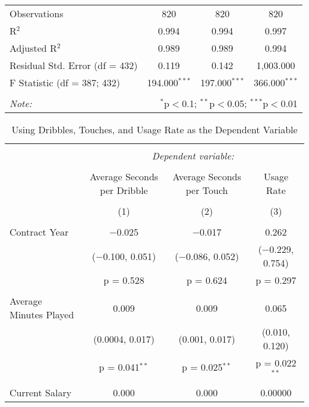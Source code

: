 \documentclass[12pt]{article}
\begin{document}
\begin{landscape}
\begin{table}[!htbp]
\begin{tabular}{@{\extracolsep{5pt}}lccc}
			Observations & 820 & 820 & 820 \\ 
			R$^{2}$ & 0.994 & 0.994 & 0.997 \\ 
			Adjusted R$^{2}$ & 0.989 & 0.989 & 0.994 \\ 
			Residual Std. Error (df = 432) & 0.119 & 0.142 & 1,003.000 \\ 
			F Statistic (df = 387; 432) & 194.000$^{***}$ & 197.000$^{***}$ & 366.000$^{***}$ \\ 
			\hline 
			\hline \\[-1.8ex] 
			\textit{Note:}  & \multicolumn{3}{r}{$^{*}$p$<$0.1; $^{**}$p$<$0.05; $^{***}$p$<$0.01} \\ 
		\end{tabular} 
	\end{table} 

	\begin{table}[!htbp] \centering 
		\caption{Using Dribbles, Touches, and Usage Rate as the Dependent Variable} 
		\label{} 
		\begin{tabular}{@{\extracolsep{5pt}}lccc} 
			\\[-1.8ex]\hline 
			\hline \\[-1.8ex] 
			& \multicolumn{3}{c}{\textit{Dependent variable:}} \\ 
			\cline{2-4} 
			\\[-1.8ex] & Average Seconds per Dribble & Average Seconds per Touch & Usage Rate \\ 
			\\[-1.8ex] & (1) & (2) & (3)\\ 
			\hline \\[-1.8ex] 
			Contract Year & $-$0.025 & $-$0.017 & 0.262 \\ 
			& ($-$0.100, 0.051) & ($-$0.086, 0.052) & ($-$0.229, 0.754) \\ 
			& p = 0.528 & p = 0.624 & p = 0.297 \\ 
			& & & \\ 
			Average Minutes Played & 0.009 & 0.009 & 0.065 \\ 
			& (0.0004, 0.017) & (0.001, 0.017) & (0.010, 0.120) \\ 
			& p = 0.041$^{**}$ & p = 0.025$^{**}$ & p = 0.022$^{**}$ \\ 
			& & & \\ 
			Current Salary & 0.000 & 0.000 & 0.00000 \\ 

\end{tabular}
\end{table}
\end{landscape}
\end{document}
